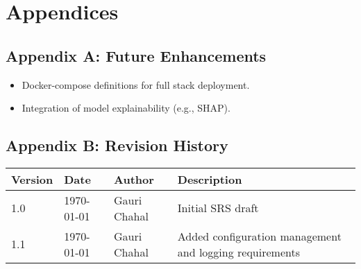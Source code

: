 \documentclass[15pt]{article}
\begin{document}
\section{Appendices}
\subsection{Appendix A: Future Enhancements}
\begin{itemize}
  \item Docker-compose definitions for full stack deployment.
  \item Integration of model explainability (e.g., SHAP).
\end{itemize}

\subsection{Appendix B: Revision History}
\begin{tabular}{|l|l|l|l|}
\hline
Version & Date & Author & Description \\
\hline
1.0 & \today & Gauri Chahal & Initial SRS draft \\
\hline
1.1 & \today & Gauri Chahal & Added configuration management and logging requirements \\
\hline
\end{tabular}
\end{document}
